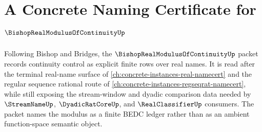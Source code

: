 \chapter{A Concrete Naming Certificate for $\BishopRealModulusOfContinuityUp$}
\label{ch:concrete-instances-bishop-real-modulus-of-continuity-namecert}

Following Bishop and Bridges, the $\BishopRealModulusOfContinuityUp$ packet records continuity control as explicit finite rows over real names. It is read after the terminal real-name surface of \autoref{ch:concrete-instances-real-namecert} and the regular sequence rational route of \autoref{ch:concrete-instances-regseqrat-namecert}, while still exposing the stream-window and dyadic comparison data needed by $\StreamNameUp$, $\DyadicRatCoreUp$, and $\RealClassifierUp$ consumers. The packet names the modulus as a finite BEDC ledger rather than as an ambient function-space semantic object.

